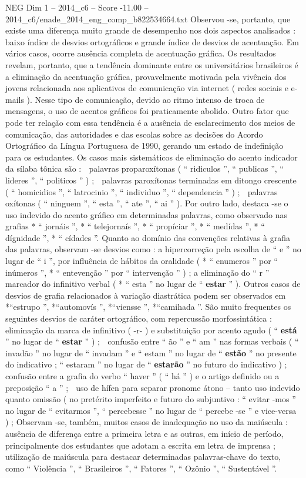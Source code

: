 \begin{textsample}{NEG Dim 1 – 2014\_c6 – Score -11.00 – 2014\_c6/enade\_2014\_eng\_comp\_b822534664.txt}
Observou -se, portanto, que existe uma diferença muito grande de desempenho nos dois aspectos analisados : baixo índice de desvios ortográficos e grande índice de desvios de acentuação.
Em vários casos, ocorre ausência completa de acentuação gráfica.
Os resultados revelam, portanto, que a tendência dominante entre os universitários brasileiros é a eliminação da acentuação gráfica, provavelmente motivada pela vivência dos jovens relacionada aos aplicativos de comunicação via internet ( redes sociais e e-mails ).
Nesse tipo de comunicação, devido ao ritmo intenso de troca de mensagens, o uso de acentos gráficos foi praticamente abolido.
Outro fator que pode ter relação com essa tendência é a ausência de esclarecimento dos meios de comunicação, das autoridades e das escolas sobre as decisões do Acordo Ortográfico da Língua Portuguesa de 1990, gerando um estado de indefinição para os estudantes.
Os casos mais sistemáticos de eliminação do acento indicador da sílaba tônica são :  palavras proparoxítonas ( “ ridiculos ”, “ publicas ”, “ lideres ”, “ politicos ” ) ;  palavras paroxítonas terminadas em ditongo crescente ( “ homicidios ”, “ latrocinio ”, “ individuo ”, “ dependencia ” ) ;  palavras oxítonas ( “ ninguem ”, “ esta ”, “ ate ”, “ ai ” ).
Por outro lado, destaca -se o uso indevido do acento gráfico em determinadas palavras, como observado nas grafias * “ jornáis ”, * “ telejornaís ”, * “ propíciar ”, * “ medídas ”, * “ dígnidade ”, * “ cídades ”.
Quanto ao domínio das convenções relativas à grafia das palavras, observam -se desvios como : a hipercorreção pela escolha de “ e ” no lugar de “ i ”, por influência de hábitos da oralidade ( * “ enumeros ” por “ inúmeros ”, * “ entevenção ” por “ intervenção ” ) ; a eliminação do “ r ” marcador do infinitivo verbal ( * “ esta ” no lugar de “ \textbf{estar} ” ).
Outros casos de desvios de grafia relacionados à variação diastrática podem ser observados em *“estrupo ”, *“automovís ”, *“viensse ”, *“camihada ”.
São muito frequentes os seguintes desvios de caráter ortográfico, com repercussão morfossintática :  eliminação da marca de infinitivo ( -r- ) e substituição por acento agudo ( “ \textbf{está} ” no lugar de “ \textbf{estar} ” ) ;  confusão entre “ ão ” e “ am ” nas formas verbais ( “ invadão ” no lugar de “ invadam ” e “ estam ” no lugar de “ \textbf{estão} ” no presente do indicativo ; “ estaram ” no lugar de “ \textbf{estarão} ” no futuro do indicativo ) ;  confusão entre a grafia do verbo “ haver ” ( “ há ” ) e o artigo definido ou a preposição “ a ” ;  uso de hífen para separar pronome átono – tanto uso indevido quanto omissão ( no pretérito imperfeito e futuro do subjuntivo : “ evitar -mos ” no lugar de “ evitarmos ”, “ percebesse ” no lugar de “ percebe -se ” e vice-versa ) ; Observam -se, também, muitos casos de inadequação no uso da maiúscula : ausência de diferença entre a primeira letra e as outras, em início de período, principalmente dos estudantes que adotam a escrita em letra de imprensa ; utilização de maiúscula para destacar determinadas palavras-chave do texto, como “ Violência ”, “ Brasileiros ”, “ Fatores ”, “ Ozônio ”, “ Sustentável ”.

\end{textsample}
